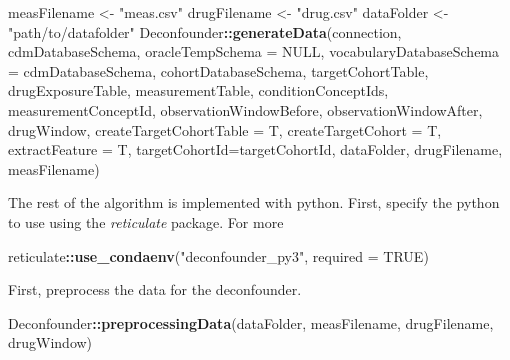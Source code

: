 \documentclass[]{article}
\newenvironment{Shaded}{\begin{snugshade}}{\end{snugshade}}
\newcommand{\DataTypeTok}[1]{\textcolor[rgb]{0.13,0.29,0.53}{#1}}
\newcommand{\KeywordTok}[1]{\textcolor[rgb]{0.13,0.29,0.53}{\textbf{#1}}}
\newcommand{\NormalTok}[1]{#1}
\newcommand{\OperatorTok}[1]{\textcolor[rgb]{0.81,0.36,0.00}{\textbf{#1}}}
\newcommand{\OtherTok}[1]{\textcolor[rgb]{0.56,0.35,0.01}{#1}}
\newcommand{\StringTok}[1]{\textcolor[rgb]{0.31,0.60,0.02}{#1}}
\begin{document}
\begin{Shaded}
\begin{Highlighting}[]
\NormalTok{measFilename \textless{}{-}}\StringTok{ "meas.csv"}
\NormalTok{drugFilename \textless{}{-}}\StringTok{ "drug.csv"}
\NormalTok{dataFolder \textless{}{-}}\StringTok{ "path/to/datafolder"}
\NormalTok{Deconfounder}\OperatorTok{::}\KeywordTok{generateData}\NormalTok{(connection,}
\NormalTok{             cdmDatabaseSchema,}
             \DataTypeTok{oracleTempSchema =} \OtherTok{NULL}\NormalTok{,}
             \DataTypeTok{vocabularyDatabaseSchema =}\NormalTok{ cdmDatabaseSchema,}
\NormalTok{             cohortDatabaseSchema,}
\NormalTok{             targetCohortTable,}
\NormalTok{             drugExposureTable,}
\NormalTok{             measurementTable,}
\NormalTok{             conditionConceptIds,}
\NormalTok{             measurementConceptId,}
\NormalTok{             observationWindowBefore,}
\NormalTok{             observationWindowAfter,}
\NormalTok{             drugWindow,}
             \DataTypeTok{createTargetCohortTable =}\NormalTok{ T,}
             \DataTypeTok{createTargetCohort =}\NormalTok{ T,}
             \DataTypeTok{extractFeature =}\NormalTok{ T,}
             \DataTypeTok{targetCohortId=}\NormalTok{targetCohortId,}
\NormalTok{             dataFolder,}
\NormalTok{             drugFilename,}
\NormalTok{             measFilename)}
\end{Highlighting}
\end{Shaded}

The rest of the algorithm is implemented with python. First, specify the
python to use using the \emph{reticulate} package. For more

\begin{Shaded}
\begin{Highlighting}[]
\NormalTok{reticulate}\OperatorTok{::}\KeywordTok{use\_condaenv}\NormalTok{(}\StringTok{"deconfounder\_py3"}\NormalTok{, }\DataTypeTok{required =} \OtherTok{TRUE}\NormalTok{)}
\end{Highlighting}
\end{Shaded}

First, preprocess the data for the deconfounder.

\begin{Shaded}
\begin{Highlighting}[]
\NormalTok{Deconfounder}\OperatorTok{::}\KeywordTok{preprocessingData}\NormalTok{(dataFolder, measFilename, drugFilename, drugWindow)}
\end{Highlighting}
\end{Shaded}
\end{document}
